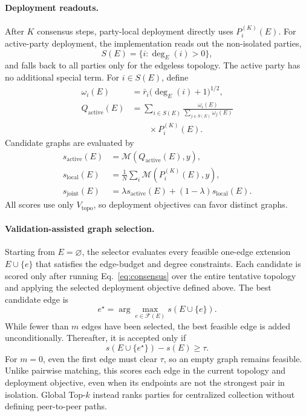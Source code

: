 \documentclass[letterpaper]{article} %
\begin{document}
\paragraph{Deployment readouts.}
After $K$ consensus steps, party-local deployment directly uses
$P_i^{(K)}(E)$. For active-party deployment, the implementation reads out the
non-isolated parties,
\[
S(E)=\{i:\deg_E(i)>0\},
\]
and falls back to all parties only for the edgeless topology. The active party
has no additional special term. For $i\in S(E)$, define
\begin{equation}
\begin{aligned}
\omega_i(E)
&=
\bar r_i\bigl(\deg_E(i)+1\bigr)^{1/2},
\\
Q_{\mathrm{active}}(E)
&=
\sum_{i\in S(E)}
\frac{\omega_i(E)}
{\sum_{j\in S(E)}\omega_j(E)}
\\[-2pt]
&\qquad {}\times P_i^{(K)}(E).
\end{aligned}
\label{eq:active_readout}
\end{equation}
 Candidate graphs are evaluated by
\begin{align}
s_{\mathrm{active}}(E)
&=
\mathcal{M}(Q_{\mathrm{active}}(E),y), \\
s_{\mathrm{local}}(E)
&=
\frac{1}{N}
\sum_i
\mathcal{M}(P_i^{(K)}(E),y), \\
s_{\mathrm{joint}}(E)
&=
\lambda s_{\mathrm{active}}(E)
+
(1-\lambda)s_{\mathrm{local}}(E).
\label{eq:deployment_objectives}
\end{align}
All scores use only $V_{\mathrm{topo}}$, so deployment objectives can favor
distinct graphs.

\paragraph{Validation-assisted graph selection.}
Starting from $E=\varnothing$, the selector evaluates every feasible one-edge
extension $E\cup\{e\}$ that satisfies the edge-budget and degree constraints.
Each candidate is scored only after running Eq.~\eqref{eq:consensus} over the
entire tentative topology and applying the selected deployment objective
defined above. The best candidate edge is
\[
e^\star
=
\arg\max_{e\in\mathcal{F}(E)}
s(E\cup\{e\}).
\]
While fewer than $m$ edges have been selected, the best feasible edge is added
unconditionally. Thereafter, it is accepted only if
\[
s(E\cup\{e^\star\})-s(E)\ge\tau.
\]
For $m=0$, even the first edge must clear $\tau$, so an empty graph remains
feasible. Unlike pairwise matching, this scores each edge in the current
topology and deployment objective, even when its endpoints are not the strongest
pair in isolation. Global Top-$k$ instead ranks parties for centralized
collection without defining peer-to-peer paths.
\end{document}
